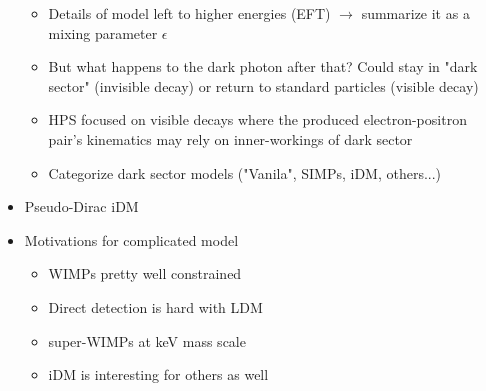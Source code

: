 \begin{itemize}
\begin{itemize}
              \item Details of model left to higher energies (EFT) $\rightarrow$ summarize it as a mixing parameter $\epsilon$ \cite{kinetic-mixing-1986}
              \item But what happens to the dark photon after that? Could stay in "dark sector" (invisible decay) or return to standard particles (visible decay)
              \item HPS focused on visible decays where the produced electron-positron pair's kinematics may rely on inner-workings of dark sector
              \item Categorize dark sector models ("Vanila", SIMPs, iDM, others...)
          \end{itemize}
    \item Pseudo-Dirac iDM
    \item Motivations for complicated model
          \begin{itemize}
              \item WIMPs pretty well constrained \cite{supercdms-2018,damic-2020,xenon1t-2018}
              \item Direct detection is hard with LDM \cite{ldmconstraints-2019}
              \item super-WIMPs at keV mass scale \cite{superwimps-2008}
              \item iDM is interesting for others as well \cite{darkseaquest-2018}
          \end{itemize}
\end{itemize}

